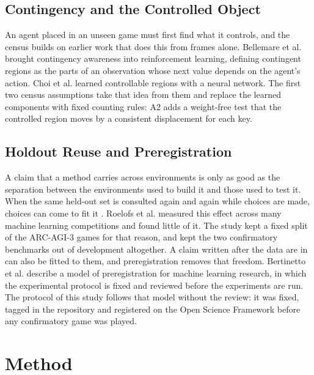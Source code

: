 \documentclass[twocolumn]{svjour3}
\begin{document}
\subsection{Contingency and the Controlled
Object}\label{sec:contingency}

An agent placed in an unseen game must first find what it controls, and
the census builds on earlier work that does this from frames alone.
Bellemare et al. \citep{bellemare2012contingency} brought contingency
awareness into reinforcement learning, defining contingent regions as
the parts of an observation whose next value depends on the agent's
action. Choi et al. \citep{choi2019contingency} learned controllable
regions with a neural network. The first two census assumptions take
that idea from them and replace the learned components with fixed
counting rules: A2 adds a weight-free test that the controlled region
moves by a consistent displacement for each key.

\subsection{Holdout Reuse and
Preregistration}\label{sec:prereg-background}

A claim that a method carries across environments is only as good as the
separation between the environments used to build it and those used to
test it. When the same held-out set is consulted again and again while
choices are made, choices can come to fit it \citep{blum2015ladder}.
Roelofs et al. \citep{roelofs2019metaanalysis} measured this effect
across many machine learning competitions and found little of it. The
study kept a fixed split of the ARC-AGI-3 games for that reason, and
kept the two confirmatory benchmarks out of development altogether. A
claim written after the data are in can also be fitted to them, and
preregistration removes that freedom. Bertinetto et al.
\citep{bertinetto2021preregistration} describe a model of
preregistration for machine learning research, in which the experimental
protocol is fixed and reviewed before the experiments are run. The
protocol of this study follows that model without the review: it was
fixed, tagged in the repository and registered on the Open Science
Framework before any confirmatory game was played.

\section{Method}\label{sec:method}
\end{document}
